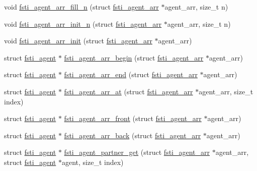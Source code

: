 \begin{DoxyCompactItemize}
\item 
void \mbox{\hyperlink{fsti-agent_8c_a87de33f5c064440c162d0c8d0f9ccbf8}{fsti\+\_\+agent\+\_\+arr\+\_\+fill\+\_\+n}} (struct \mbox{\hyperlink{structfsti__agent__arr}{fsti\+\_\+agent\+\_\+arr}} $\ast$agent\+\_\+arr, size\+\_\+t n)
\item 
void \mbox{\hyperlink{fsti-agent_8c_a2dc08a5f50e57b979f50f6efb927d57c}{fsti\+\_\+agent\+\_\+arr\+\_\+init\+\_\+n}} (struct \mbox{\hyperlink{structfsti__agent__arr}{fsti\+\_\+agent\+\_\+arr}} $\ast$agent\+\_\+arr, size\+\_\+t n)
\item 
void \mbox{\hyperlink{fsti-agent_8c_ab657b71989567b40adc4ccea49292540}{fsti\+\_\+agent\+\_\+arr\+\_\+init}} (struct \mbox{\hyperlink{structfsti__agent__arr}{fsti\+\_\+agent\+\_\+arr}} $\ast$agent\+\_\+arr)
\item 
struct \mbox{\hyperlink{structfsti__agent}{fsti\+\_\+agent}} $\ast$ \mbox{\hyperlink{fsti-agent_8c_a30c755dbd7cd8e98b76ebe65b8dc54a2}{fsti\+\_\+agent\+\_\+arr\+\_\+begin}} (struct \mbox{\hyperlink{structfsti__agent__arr}{fsti\+\_\+agent\+\_\+arr}} $\ast$agent\+\_\+arr)
\item 
struct \mbox{\hyperlink{structfsti__agent}{fsti\+\_\+agent}} $\ast$ \mbox{\hyperlink{fsti-agent_8c_a1a5fc4621ece587a603b9b970bc3bd7c}{fsti\+\_\+agent\+\_\+arr\+\_\+end}} (struct \mbox{\hyperlink{structfsti__agent__arr}{fsti\+\_\+agent\+\_\+arr}} $\ast$agent\+\_\+arr)
\item 
struct \mbox{\hyperlink{structfsti__agent}{fsti\+\_\+agent}} $\ast$ \mbox{\hyperlink{fsti-agent_8c_a9f01e2df0acb48b1e9cef63d4314c209}{fsti\+\_\+agent\+\_\+arr\+\_\+at}} (struct \mbox{\hyperlink{structfsti__agent__arr}{fsti\+\_\+agent\+\_\+arr}} $\ast$agent\+\_\+arr, size\+\_\+t index)
\item 
struct \mbox{\hyperlink{structfsti__agent}{fsti\+\_\+agent}} $\ast$ \mbox{\hyperlink{fsti-agent_8c_aaad30933ebf477fc44ee2f7123d335b6}{fsti\+\_\+agent\+\_\+arr\+\_\+front}} (struct \mbox{\hyperlink{structfsti__agent__arr}{fsti\+\_\+agent\+\_\+arr}} $\ast$agent\+\_\+arr)
\item 
struct \mbox{\hyperlink{structfsti__agent}{fsti\+\_\+agent}} $\ast$ \mbox{\hyperlink{fsti-agent_8c_a88eb4bd7a7df9dcbc5b57d3e3e22f9c6}{fsti\+\_\+agent\+\_\+arr\+\_\+back}} (struct \mbox{\hyperlink{structfsti__agent__arr}{fsti\+\_\+agent\+\_\+arr}} $\ast$agent\+\_\+arr)
\item 
struct \mbox{\hyperlink{structfsti__agent}{fsti\+\_\+agent}} $\ast$ \mbox{\hyperlink{fsti-agent_8c_a8ea9850f51ba1cc3f842f3730cf22139}{fsti\+\_\+agent\+\_\+partner\+\_\+get}} (struct \mbox{\hyperlink{structfsti__agent__arr}{fsti\+\_\+agent\+\_\+arr}} $\ast$agent\+\_\+arr, struct \mbox{\hyperlink{structfsti__agent}{fsti\+\_\+agent}} $\ast$agent, size\+\_\+t index)

\end{DoxyCompactItemize}
